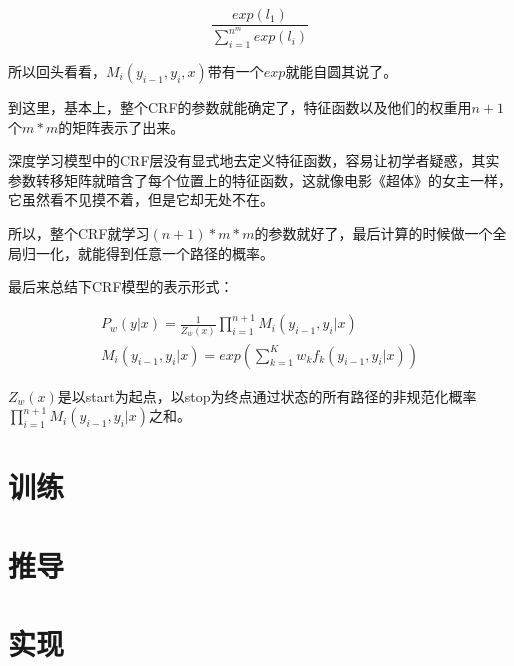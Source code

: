 \documentclass[11pt]{article}
\begin{document}
\begin{equation}\label{key}
	\frac{exp(l_1)}{\sum_{i=1}^{n^m}exp(l_i)}
\end{equation}

所以回头看看，$M_i(y_{i-1}, y_i, x)$带有一个$exp$就能自圆其说了。

到这里，基本上，整个CRF的参数就能确定了，特征函数以及他们的权重用$n+1$个$m*m$的矩阵表示了出来。

深度学习模型中的CRF层没有显式地去定义特征函数，容易让初学者疑惑，其实参数转移矩阵就暗含了每个位置上的特征函数，这就像电影《超体》的女主一样，它虽然看不见摸不着，但是它却无处不在。

所以，整个CRF就学习$(n+1)*m*m$的参数就好了，最后计算的时候做一个全局归一化，就能得到任意一个路径的概率。

最后来总结下CRF模型的表示形式：

\begin{gather*}\label{key}
	P_w(y|x) = \frac{1}{Z_w(x)}\prod_{i=1}^{n+1} M_i(y_{i-1}, y_i|x)\\
	M_i(y_{i-1}, y_i|x) = exp(\sum_{k=1}^K w_kf_k(y_{i-1}, y_i|x))
\end{gather*}

$Z_w(x)$是以start为起点，以stop为终点通过状态的所有路径的非规范化概率$\prod_{i=1}^{n+1} M_i(y_{i-1}, y_i|x)$之和。

\section{训练}

\section{推导}

\section{实现}



\end{document}
